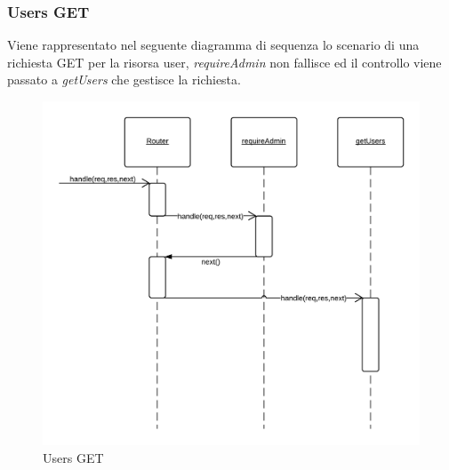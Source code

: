 \subsubsection{Users GET}
Viene rappresentato nel seguente diagramma di sequenza lo scenario di una richiesta GET per la risorsa user, \emph{requireAdmin} non fallisce ed il controllo viene passato a \emph{getUsers} che gestisce la richiesta.
\begin{figure}[H]
	\begin{center} 
		\includegraphics[scale=0.20]{scenari/Users GET.png} 
		\caption{Users GET}
	\end{center} 
\end{figure}

